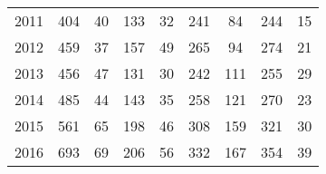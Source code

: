 \begin{table}[htbp]
\begin{tabular}{l*{8}{c}}
2011      &      404&       40&      133&       32&      241&       84&      244&       15\\
2012      &      459&       37&      157&       49&      265&       94&      274&       21\\
2013      &      456&       47&      131&       30&      242&      111&      255&       29\\
2014      &      485&       44&      143&       35&      258&      121&      270&       23\\
2015      &      561&       65&      198&       46&      308&      159&      321&       30\\
2016      &      693&       69&      206&       56&      332&      167&      354&       39\\
\hline\hline
\end{tabular}
\end{table}
